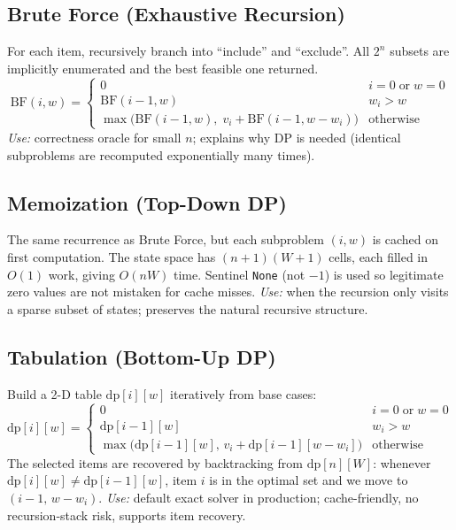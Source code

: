 \documentclass[11pt, a4paper]{article}
\begin{document}
\subsection{Brute Force (Exhaustive Recursion)}
For each item, recursively branch into ``include'' and ``exclude''. All $2^n$
subsets are implicitly enumerated and the best feasible one returned.
\begin{equation}
\mathrm{BF}(i,w)=\begin{cases}
0 & i=0\;\text{or}\;w=0\\
\mathrm{BF}(i-1,w) & w_i>w\\
\max\bigl(\mathrm{BF}(i-1,w),\;v_i+\mathrm{BF}(i-1,w-w_i)\bigr) & \text{otherwise}
\end{cases}
\end{equation}
\textit{Use:} correctness oracle for small $n$; explains why DP is needed
(identical subproblems are recomputed exponentially many times).

\subsection{Memoization (Top-Down DP)}
The same recurrence as Brute Force, but each subproblem $(i,w)$ is cached on
first computation. The state space has $(n+1)(W+1)$ cells, each filled in $O(1)$
work, giving $O(nW)$ time. Sentinel \texttt{None} (not $-1$) is used so
legitimate zero values are not mistaken for cache misses. \textit{Use:} when the
recursion only visits a sparse subset of states; preserves the natural recursive
structure.

\subsection{Tabulation (Bottom-Up DP)}
Build a 2-D table $\mathrm{dp}[i][w]$ iteratively from base cases:
\begin{equation}
\mathrm{dp}[i][w]=\begin{cases}
0 & i=0\;\text{or}\;w=0\\
\mathrm{dp}[i-1][w] & w_i>w\\
\max\bigl(\mathrm{dp}[i-1][w],\,v_i+\mathrm{dp}[i-1][w-w_i]\bigr) & \text{otherwise}
\end{cases}
\label{eq:dp}
\end{equation}
The selected items are recovered by backtracking from $\mathrm{dp}[n][W]$:
whenever $\mathrm{dp}[i][w]\neq\mathrm{dp}[i-1][w]$, item $i$ is in the optimal
set and we move to $(i-1,\,w-w_i)$. \textit{Use:} default exact solver in
production; cache-friendly, no recursion-stack risk, supports item recovery.
\end{document}
